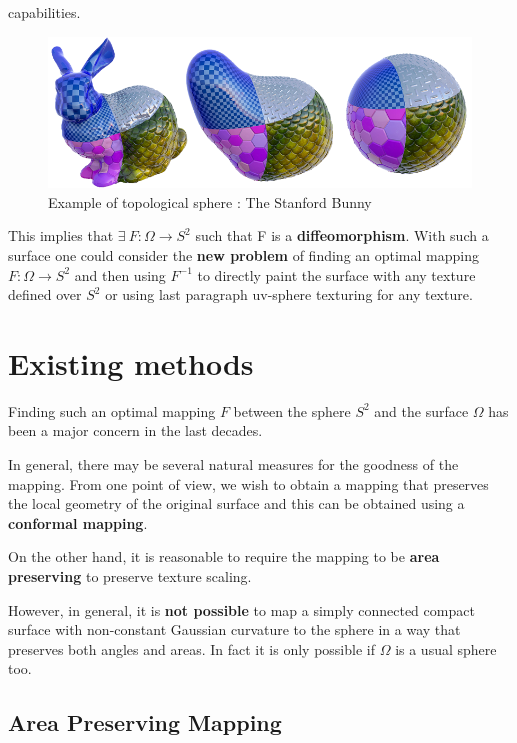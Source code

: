 capabilities.\documentclass[11pt,a4paper]{article}
\begin{document}
\vskip 0.3cm
\begin{figure}[H]
   \centering
   \includegraphics[width=12cm]{3.png}
   \caption{Example of topological sphere : The Stanford Bunny}
\end{figure}
\vskip 0.3cm

This implies that $\exists\ F : \Omega \to S^2$ such that F is a \textbf{diffeomorphism}.
With such a surface one could consider the \textbf{new problem} of finding an optimal mapping $F : \Omega \to S^2$ and then using $F^{-1}$ to directly paint the surface with any texture defined over $S^2$ or using last paragraph uv-sphere texturing for any texture.

\section{Existing methods}

Finding such an optimal mapping $F$ between the sphere $S^2$ and the surface $\Omega$ has been a major concern in the last decades.

\vskip 0.3cm

In general, there may be several natural measures for the goodness of the mapping. 
From one point of view, we wish to obtain a mapping that preserves the local geometry of the original
surface and this can be obtained using a \textbf{conformal mapping}.

\vskip 0.3cm

On the other hand, it is reasonable to require the mapping to be \textbf{area preserving} to preserve texture scaling.

\vskip 0.3cm

However, in general, it is \textbf{not possible} to map a simply connected compact surface with non-constant Gaussian curvature to the sphere in a way that preserves both angles and areas. In fact it is only possible if $\Omega$ is a usual sphere too.

\subsection{Area Preserving Mapping}
\end{document}
